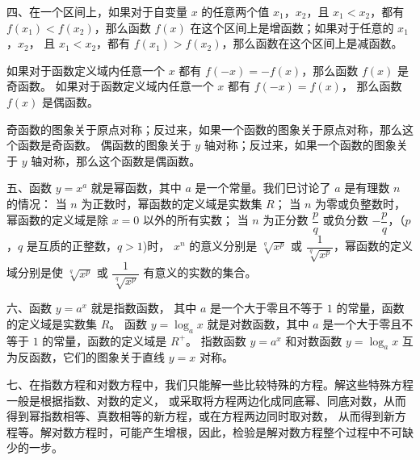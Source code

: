 四、在一个区间上，如果对于自变量 $x$ 的任意两个值 $x_1$，$x_2$，且 $x_1 < x_2$，都有
$f(x_1) < f(x_2)$，那么函数 $f(x)$ 在这个区间上是增函数；如果对于任意的 $x_1$，$x_2$，
且 $x_1 < x_2$，都有 $f(x_1) > f(x_2)$，那么函数在这个区间上是减函数。

如果对于函数定义域内任意一个 $x$ 都有 $f(-x) = -f(x)$，那么函数 $f(x)$ 是奇函数。
如果对于函数定义域内任意一个 $x$ 都有 $f(-x) = f(x)$， 那么函数 $f(x)$ 是偶函数。

奇函数的图象关于原点对称；反过来，如果一个函数的图象关于原点对称，那么这个函数是奇函数。
偶函数的图象关于 $y$ 轴对称；反过来，如果一个函数的图象关于 $y$ 轴对称，那么这个函数是偶函数。

五、函数 $y = x^a$ 就是幂函数，其中 $a$ 是一个常量。我们巳讨论了 $a$ 是有理数 $n$ 的情况：
当 $n$ 为正数时，幂函数的定义域是实数集 $R$；
当 $n$ 为零或负整数时，幂函数的定义域是除 $x = 0$ 以外的所有实数；
当 $n$ 为正分数 $\dfrac p q$ 或负分数 $-\dfrac p q$，（$p$，$q$ 是互质的正整数，$q > 1$)时，
$x^n$ 的意义分别是 $\sqrt[q]{x^p}$ 或 $\dfrac{1}{\sqrt[q]{x^p}}$，幂函数的定义域分别是使
$\sqrt[q]{x^p}$ 或 $\dfrac{1}{\sqrt[q]{x^p}}$ 有意义的实数的集合。

六、函数 $y = a^x$ 就是指数函数， 其中 $a$ 是一个大于零且不等于 $1$ 的常量，函数的定义域是实数集 $R$。
函数 $y = \log_a x$ 就是对数函数，其中 $a$ 是一个大于零且不等于 $1$ 的常量，函数的定义域是 $R^+$。
指数函数 $y = a^x$ 和对数函数 $y = \log_a x$ 互为反函数，它们的图象关于直线 $y = x$ 对称。

七、在指数方程和对数方程中，我们只能解一些比较特殊的方程。解这些特殊方程一般是根据指数、对数的定义，
或采取将方程两边化成同底幂、同底对数，从而得到幂指数相等、真数相等的新方程，或在方程两边同时取对数，
从而得到新方程等。解对数方程时，可能产生增根，因此，检验是解对数方程整个过程中不可缺少的一步。
